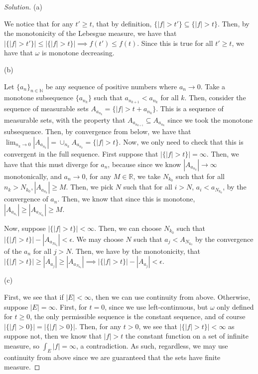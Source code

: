 \documentclass[10pt]{article}
\begin{document}
\begin{proof}[Solution]

(a)

We notice that for any $t' \geq t$, that by definition, $\{ |f| > t' \} \subseteq \{ |f| > t \}$. Then, by the monotonicity of the Lebesgue measure, we have that $|\{ |f| > t' \}| \leq |\{ |f| > t \}| \implies f(t') \leq f(t)$. Since this is true for all $t' \geq t$, we have that $\omega$ is monotone decreasing.

(b) 

Let $\{ a_n \}_{n \in \mathbb{N}}$ be any sequence of positive numbers where $a_n \to 0$. Take a monotone subsequence $\{ a_{n_k} \}$ such that $a_{n_{k+1}} < a_{n_k}$  for all $k$. Then, consider the sequence of measurable sets $A_{a_{n_k}} =  \{ |f| > t + a_{n_k} \}$. This is a sequence of measurable sets, with the property that $A_{a_{n_{k+1}}} \subseteq A_{a_{n_k}}$ since we took the monotone subsequence. Then, by convergence from below, we have that $\lim_{n_k \to 0} |A_{a_{n_k}}| = \cup_{n_k} A_{a_{n_k}} = \{ |f| > t \}$. Now, we only need to check that this is convergent in the full sequence. First suppose that $|\{ |f| > t \}|  = \infty$. Then, we have that this must diverge for $a_n$, because since we know $|A_{a_{n_k}}| \to \infty$ monotonically, and $a_n \to 0$, for any $M \in \mathbb{R}$, we take $N_{k_0}$ such that for all $n_k > N_{k_0}, |A_{a_{n_k}}| \geq M$. Then, we pick $N$ such that for all $i > N$, $a_i < a_{N_{k_0}}$, by the convergence of $a_n$. Then, we know that since this is monotone, $|A_{a_{n_i}}| \geq |A_{a_{N_{k_0}}}| \geq M$. 

Now, suppose  $|\{ |f| > t \}|  < \infty$. Then, we can choose $N_{k_0}$ such that $|\{ |f| > t \}| - |A_{a_{N_{k_0}}}| < \epsilon$. We may choose $N$ such that $a_j < A_{N_{k_0}}$ by the convergence of the $a_n$ for all $j > N$. Then, we have by the monotonicity, that $ |\{ |f| > t \}| \geq |A_{a_j}| \geq |A_{a_{N_{k_0}}}| \implies |\{ |f| > t \}| - |A_{a_j}| < \epsilon$.

(c)

First, we see that if $|E| < \infty$, then we can use continuity from above. Otherwise, suppose $|E| = \infty$. First, for $t = 0$, since we use left-continuous, but $\omega$ only defined for $t \geq 0$, the only permissible sequence is the constant sequence, and of course $|\{ |f| > 0 \} | = |\{ |f| > 0 \} |$. Then, for any $ t > 0 $, we see that $|\{ |f| > t \}| < \infty$ as suppose not, then we know that $|f| > t$ the constant function on a set of infinite measure, so $\int_E |f| = \infty$, a contradiction. As such, regardless, we may use continuity from above since we are guaranteed that the sets have finite measure.


\end{proof}
\end{document}
